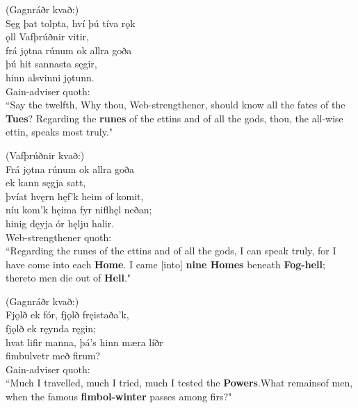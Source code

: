(Gagnráðr kvað:) \\%
\bva Sęg þat tolpta, \hld hví þú tíva rǫk \\%
ǫll Vafþrúðnir vitir, \\%
frá jǫtna rúnum \hld ok allra goða \\%
þú hit sannasta sęgir, \\%
hinn alsvinni jǫtunn.\\%

\bvb Gain-adviser quoth: \\ “Say the twelfth, Why thou, Web-strengthener, should know all the fates of the \textbf{Tues}\footnotemark[73]? Regarding the \textbf{runes} of the ettins and of all the gods, thou, the all-wise ettin, speaks most truly." \\

(Vafþrúðnir kvað:) \\%
\bva Frá jǫtna rúnum \hld ok allra goða \\%
ek kann sęgja satt, \\%
þvíat hvęrn hęf'k \hld heim of komit, \\%
níu kom'k hęima \hld fyr niflhęl neðan; \\%
hinig dęyja ór hęlju halir.\\%

\bvb Web-strengthener quoth: \\ “Regarding the runes of the ettins and of all the gods, I can speak truly, for I have come into each \textbf{Home}. I came [into] \textbf{nine Homes} beneath \textbf{Fog-hell}; thereto men die out of \textbf{Hell}\footnotemark[75]." \\

(Gagnráðr kvað:) \\%
\bva Fjǫlð ek fór, \hld fjǫlð fręistaða'k, \\%
fjǫlð ek ręynda ręgin; \\%
hvat lifir manna, \hld þá's hinn mæra líðr \\%
fimbulvetr með firum?\\%

\bvb Gain-adviser quoth: \\ “Much I travelled, much I tried, much I tested the \textbf{Powers}.\footnotemark[80] What remains\footnotemark[79] of men, when the famous \textbf{fimbol-winter} passes among firs\footnotemark[81]?" \\

